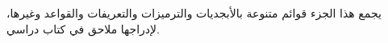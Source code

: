 \documentclass[../../include/open-logic-part]{subfiles}
\begin{document}

\begin{editorial}
  يجمع هذا الجزء قوائم متنوعة بالأبجديات والترميزات والتعريفات
  والقواعد وغيرها، لإدراجها ملاحق في كتاب دراسي.
\end{editorial}



\OLEndPartHook
\end{document}
